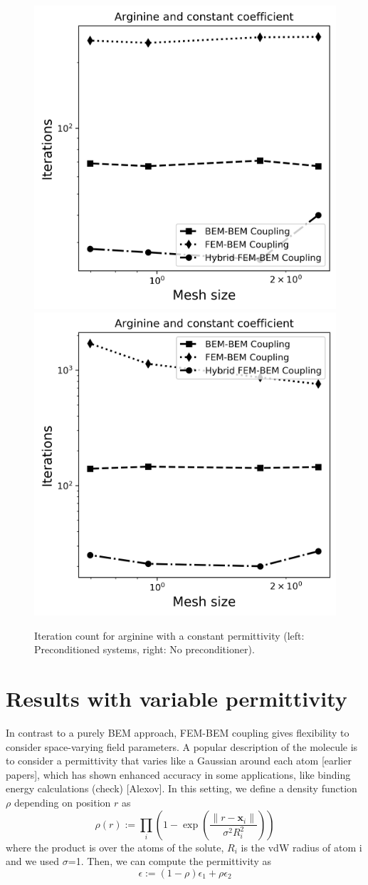 \begin{figure}
\centering
  \includegraphics[width=0.45\linewidth]{Arginine_const_coeff_iter.png}
  \includegraphics[width=0.45\linewidth]{No_prec_Arginine_const_coeff_iter.png}
\caption{Iteration count for arginine with a constant permittivity (left: Preconditioned systems, right: No preconditioner). %
}
\label{fig:arg_contant_iter}
\end{figure}



\section*{\sffamily \Large Results with variable permittivity}

In contrast to a purely BEM approach, FEM-BEM coupling gives flexibility to consider space-varying field parameters. 
A popular description of the molecule is to consider a permittivity that varies like a Gaussian around each atom [earlier papers], which has shown enhanced accuracy in some applications, like binding energy calculations (check) [Alexov].
In this setting, we define a density function $\rho$ depending on position $r$ as
%
\begin{equation}
\rho(r) := \prod_i \left(1 - \exp{\left(\frac{\|r-\mathbf{x}_i\|}{\sigma^2 R_i^2}\right)}\right)
\end{equation}
%
where the product is over the atoms of the solute, $R_i$ is the vdW
radius of atom i and we used $\sigma$=1. Then, we can compute the permittivity as
%
\begin{equation}
\epsilon := \left(1-\rho \right) \epsilon_1 + \rho\epsilon_2
\end{equation}
%

